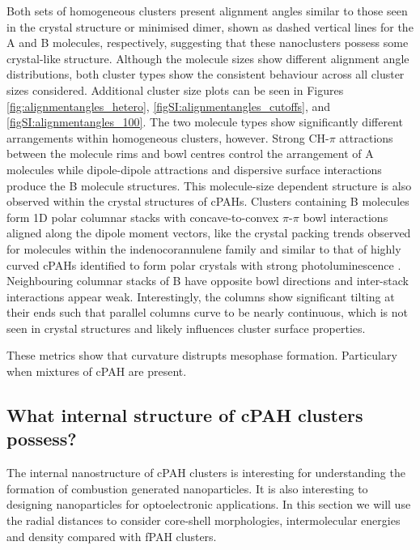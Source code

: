 Both sets of homogeneous clusters present alignment angles similar to those seen in the crystal structure or minimised dimer, shown as dashed vertical lines for the A and B molecules, respectively, suggesting that these nanoclusters possess some crystal-like structure.  Although the molecule sizes show different alignment angle distributions, both cluster types show the consistent behaviour across all cluster sizes considered. Additional cluster size plots can be seen in Figures \ref{fig:alignmentangles_hetero}, \ref{figSI:alignmentangles_cutoffs}, and \ref{figSI:alignmentangles_100}. The two molecule types show significantly different arrangements within homogeneous clusters, however. Strong CH-$\pi$ attractions between the molecule rims and bowl centres control the arrangement of A molecules while dipole-dipole attractions and dispersive surface interactions produce the B molecule structures. This molecule-size dependent structure is also observed within the crystal structures of cPAHs. Clusters containing B molecules form 1D polar columnar stacks with concave-to-convex $\pi$-$\pi$ bowl interactions aligned along the dipole moment vectors, like the crystal packing trends observed for molecules within the indenocorannulene family \cite{Filatov2010} and similar to that of highly curved cPAHs identified to form polar crystals with strong photoluminescence \cite{chen2014highly}. Neighbouring columnar stacks of B have opposite bowl directions and inter-stack interactions appear weak. Interestingly, the columns show significant tilting at their ends such that parallel columns curve to be nearly continuous, which is not seen in crystal structures and likely influences cluster surface properties.
%

These metrics show that curvature distrupts mesophase formation. Particulary when mixtures of cPAH are present. 


\subsection{What internal structure of cPAH clusters possess?}
The internal nanostructure of cPAH clusters is interesting for understanding the formation of combustion generated nanoparticles. It is also interesting to designing nanoparticles for optoelectronic applications. In this section we will use the radial distances to consider core-shell morphologies, intermolecular energies and density compared with fPAH clusters. 

